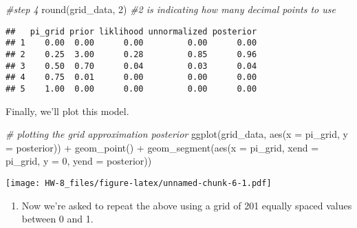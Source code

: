 \documentclass[
]{article}
\newenvironment{Shaded}{\begin{snugshade}}{\end{snugshade}}
\newcommand{\AttributeTok}[1]{\textcolor[rgb]{0.77,0.63,0.00}{#1}}
\newcommand{\CommentTok}[1]{\textcolor[rgb]{0.56,0.35,0.01}{\textit{#1}}}
\newcommand{\DecValTok}[1]{\textcolor[rgb]{0.00,0.00,0.81}{#1}}
\newcommand{\FunctionTok}[1]{\textcolor[rgb]{0.00,0.00,0.00}{#1}}
\newcommand{\NormalTok}[1]{#1}
\newcommand{\SpecialCharTok}[1]{\textcolor[rgb]{0.00,0.00,0.00}{#1}}
\providecommand{\tightlist}{%
  \setlength{\itemsep}{0pt}\setlength{\parskip}{0pt}}
\begin{document}
\begin{Shaded}
\begin{Highlighting}[]
\CommentTok{\#step 4}
\FunctionTok{round}\NormalTok{(grid\_data, }\DecValTok{2}\NormalTok{) }\CommentTok{\#2 is indicating how many decimal points to use }
\end{Highlighting}
\end{Shaded}

\begin{verbatim}
##   pi_grid prior liklihood unnormalized posterior
## 1    0.00  0.00      0.00         0.00      0.00
## 2    0.25  3.00      0.28         0.85      0.96
## 3    0.50  0.70      0.04         0.03      0.04
## 4    0.75  0.01      0.00         0.00      0.00
## 5    1.00  0.00      0.00         0.00      0.00
\end{verbatim}

Finally, we'll plot this model.

\begin{Shaded}
\begin{Highlighting}[]
\CommentTok{\# plotting the grid approximation posterior}
\FunctionTok{ggplot}\NormalTok{(grid\_data, }\FunctionTok{aes}\NormalTok{(}\AttributeTok{x =}\NormalTok{ pi\_grid, }\AttributeTok{y =}\NormalTok{ posterior)) }\SpecialCharTok{+} 
  \FunctionTok{geom\_point}\NormalTok{() }\SpecialCharTok{+} 
  \FunctionTok{geom\_segment}\NormalTok{(}\FunctionTok{aes}\NormalTok{(}\AttributeTok{x =}\NormalTok{ pi\_grid, }\AttributeTok{xend =}\NormalTok{ pi\_grid, }\AttributeTok{y =} \DecValTok{0}\NormalTok{, }\AttributeTok{yend =}\NormalTok{ posterior))}
\end{Highlighting}
\end{Shaded}

\texttt{[image: HW-8\_files/figure-latex/unnamed-chunk-6-1.pdf]}

\begin{enumerate}
\def\labelenumi{\alph{enumi})}
\setcounter{enumi}{1}
\tightlist
\item
  Now we're asked to repeat the above using a grid of 201 equally spaced
  values between 0 and 1.
\end{enumerate}
\end{document}
